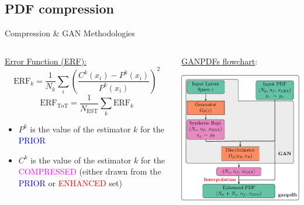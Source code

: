 \providecommand{\iRef}[1]{{\tiny\color{HallowGreen} $[$#1$]$}}

\author[Tanjona Rabemananjara]{}

\subsection{PDF compression}

\begin{frame}{Compression \& GAN Methodologies}
	\begin{columns}[T] 
		\begin{column}{.5\textwidth}
			\underline{Error Function (ERF):}
			\begin{equation*}
				\mathrm{ERF}_k = \frac{1}{N_k} \sum_{i}
				\left( \frac{C^{k}(x_{i}) - P^{k}(x_{i})}{P^{k}(x_{i})} \right)^2 
			\end{equation*}
			\begin{equation*}
				\mathrm{ERF}_\text{ToT} = \frac{1}{N_{\text{EST}}} \sum_{k} \mathrm{ERF}_k
			\end{equation*}
		\begin{itemize}
			\item $P^{k}$ is the value of the estimator $k$ for the \textcolor{blue}{PRIOR}
			\item $C^{k}$ is the value of the estimator $k$ for the \textcolor{magenta}{COMPRESSED}
			(either drawn from the \textcolor{blue}{PRIOR} or \textcolor{red}{ENHANCED} set)
		\end{itemize}
		\end{column}
		\hfill
		\begin{column}{.5\textwidth}	
			\underline{GANPDFs flowchart}:
			\begin{center}
				\includegraphics[height=.7\textheight]{./gan_compressor/imgs/gan-standalone.pdf}

\end{center}
\end{column}
\end{columns}
\end{frame}
